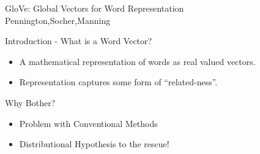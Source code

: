 \begin{frame}
  \begin{center}
    {
      \huge GloVe: Global Vectors for Word Representation
    } \\
    Pennington,Socher,Manning
  \end{center}
\end{frame}

\begin{frame}{Introduction - What is a Word Vector?}
  \begin{itemize}[<+->]
  \item A mathematical representation of words as real valued vectors.
  \item Representation captures some form of ``related-ness''.
    \begin{figure}

    \end{figure}    
  \end{itemize}
\end{frame}


\begin{frame}

  \begin{center}
    {
      \huge Why Bother?
    } \\
  \end{center}
  \pause
  \begin{itemize}[<+->]
  \item Problem with Conventional Methods
  \item Distributional Hypothesis to the rescue!
  \end{itemize}
  
\end{frame}


